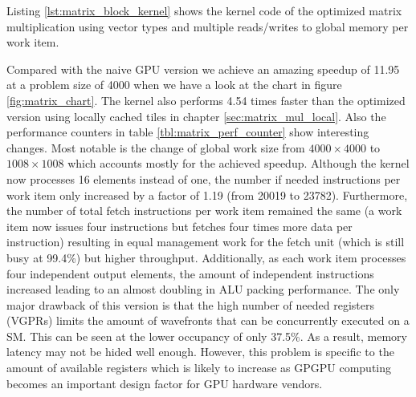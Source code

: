 Listing \ref{lst:matrix_block_kernel} shows the kernel code of the optimized matrix multiplication using vector types and multiple reads/writes to global memory per work item.



Compared with the naive GPU version we achieve an amazing speedup of 11.95 at a problem size of 4000 when we have a look at the chart in figure \ref{fig:matrix_chart}.
The kernel also performs 4.54 times faster than the optimized version using locally cached tiles in chapter \ref{sec:matrix_mul_local}.
Also the performance counters in table \ref{tbl:matrix_perf_counter} show interesting changes. Most notable is the change of global work size from $4000 \times 4000$ to $1008 \times 1008$ which accounts mostly for the achieved speedup. Although the kernel now processes 16 elements instead of one, the number if needed instructions per work item only increased by a factor of 1.19 (from 20019 to 23782). Furthermore, the number of total fetch instructions per work item remained the same (a work item now issues four instructions but fetches four times more data per instruction) resulting in equal management work for the fetch unit (which is still busy at 99.4\%) but higher throughput. Additionally, as each work item processes four independent output elements, the amount of independent instructions increased leading to an almost doubling in ALU packing performance. The only major drawback of this version is that the high number of needed registers (VGPRs) limits the amount of wavefronts that can be concurrently executed on a SM. This can be seen at the lower occupancy of only 37.5\%. As a result, memory latency may not be hided well enough. However, this problem is specific to the amount of available registers which is likely to increase as GPGPU computing becomes an important design factor for GPU hardware vendors.


